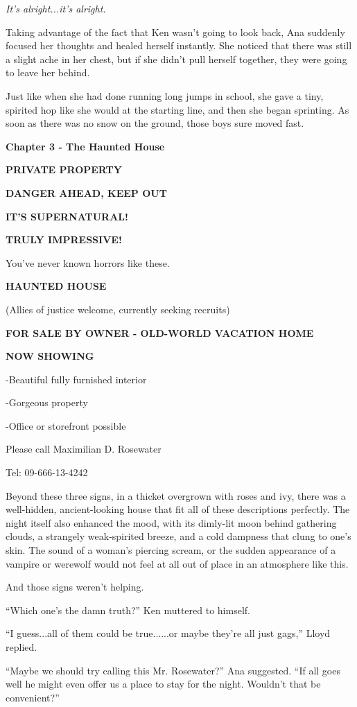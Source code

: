 \documentclass[
]{article}
\begin{document}
\emph{It's alright...it's alright.}

Taking advantage of the fact that Ken wasn't going to look back, Ana
suddenly focused her thoughts and healed herself instantly. She noticed
that there was still a slight ache in her chest, but if she didn't pull
herself together, they were going to leave her behind.

Just like when she had done running long jumps in school, she gave a
tiny, spirited hop like she would at the starting line, and then she
began sprinting. As soon as there was no snow on the ground, those boys
sure moved fast.

\textbf{Chapter 3 - The Haunted House}

\textbf{PRIVATE PROPERTY}

\textbf{DANGER AHEAD, KEEP OUT}

\textbf{IT'S SUPERNATURAL!}

\textbf{TRULY IMPRESSIVE!}

You've never known horrors like these.

\textbf{HAUNTED HOUSE}

(Allies of justice welcome, currently seeking recruits)

\textbf{FOR SALE BY OWNER - OLD-WORLD VACATION HOME}

\textbf{NOW SHOWING}

-Beautiful fully furnished interior

-Gorgeous property

-Office or storefront possible

Please call Maximilian D. Rosewater

Tel: 09-666-13-4242

Beyond these three signs, in a thicket overgrown with roses and ivy,
there was a well-hidden, ancient-looking house that fit all of these
descriptions perfectly. The night itself also enhanced the mood, with
its dimly-lit moon behind gathering clouds, a strangely weak-spirited
breeze, and a cold dampness that clung to one's skin. The sound of a
woman's piercing scream, or the sudden appearance of a vampire or
werewolf would not feel at all out of place in an atmosphere like this.

And those signs weren't helping.

``Which one's the damn truth?'' Ken muttered to himself.

``I guess...all of them could be true......or maybe they're all just
gags,'' Lloyd replied.

``Maybe we should try calling this Mr. Rosewater?'' Ana suggested. ``If
all goes well he might even offer us a place to stay for the night.
Wouldn't that be convenient?''
\end{document}
